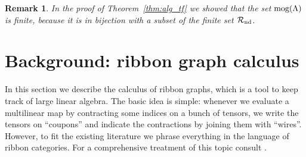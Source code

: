 \documentclass{amsart}
\newtheorem{remark}[conjecture]{Remark}
\newcommand{\tn}{\textnormal}
\begin{document}
\begin{remark}\label{rmk:mog_finite}
In the proof of Theorem~\ref{thm:alg_tf} we showed that the set $\tn{mog}(\Lambda)$ is finite, because it is in bijection with a subset of the finite set $\mathcal{R}_{\tn{nd}}$.
\end{remark}

\section{Background: ribbon graph calculus}\label{sec:ribbon_graph}

In this section we describe the calculus of ribbon graphs, which is a tool to keep track of large linear algebra. The basic idea is simple: whenever we evaluate a multilinear map by contracting some indices on a bunch of tensors, we write the tensors on ``coupons'' and indicate the contractions by joining them with ``wires''. However, to fit the existing literature we phrase everything in the language of ribbon categories. For a comprehensive treatment of this topic consult \cites{graphical_language_monoidal_categories_Selinger11}{quantum_invariants_knots_3mflds_Turaev16}.
\end{document}
